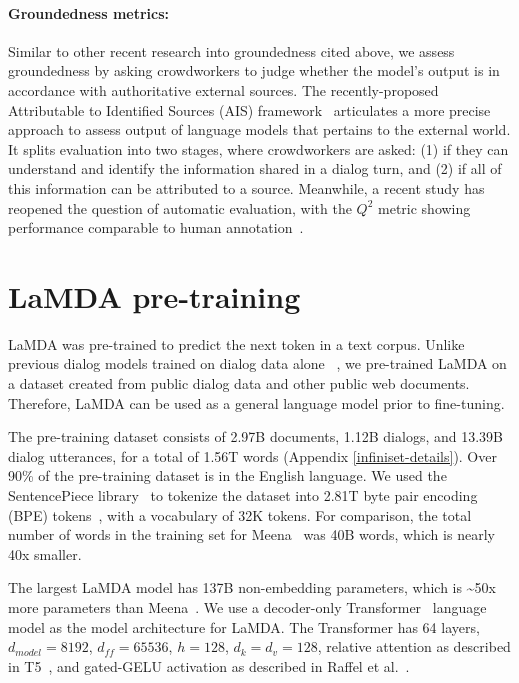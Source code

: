 \paragraph{Groundedness metrics:} Similar to other recent research into groundedness cited above, we assess groundedness by asking crowdworkers to judge whether the model’s output is in accordance with authoritative external sources. The recently-proposed Attributable to Identified Sources (AIS) framework~\cite{rashkin2021measuring} articulates a more precise approach to assess output of language models that pertains to the external world. It splits evaluation into two stages, where crowdworkers are asked: (1) if they can understand and identify the information shared in a dialog turn, and (2) if all of this information can be attributed to a source. Meanwhile, a recent study has reopened the question of automatic evaluation, with the $Q^2$ metric showing performance comparable to human annotation~\cite{honovich2021q2}.

\section{LaMDA pre-training}
\label{sec:pretraining}

LaMDA was pre-trained to predict the next token in a text corpus. Unlike previous dialog models trained on dialog data alone ~\cite{adiwardana2020humanlike,blenderbot}, we pre-trained LaMDA on a dataset created from public dialog data and other public web documents. Therefore, LaMDA can be used as a general language model prior to fine-tuning.

The pre-training dataset consists of 2.97B documents, 1.12B dialogs, and 13.39B dialog utterances, for a total of 1.56T words (Appendix \ref{infiniset-details}). Over 90\% of the pre-training dataset is in the English language. We used the SentencePiece library~\cite{sentencepiece} to tokenize the dataset into 2.81T byte pair encoding (BPE) tokens~\cite{sennrich2015neural}, with a vocabulary of 32K tokens. For comparison, the total number of words in the training set for Meena~\cite{adiwardana2020humanlike} was 40B words, which is nearly 40x smaller. 

The largest LaMDA model has 137B non-embedding parameters, which is {\textasciitilde}50x more parameters than Meena~\cite{adiwardana2020humanlike}. We use a decoder-only Transformer~\cite{Vaswani2017AttentionIA} language model as the model architecture for LaMDA. The Transformer has 64 layers, $d_{model}=8192$, $d_{ff}=65536$, $h=128$, $d_k=d_v=128$, relative attention as described in T5~\cite{t5}, and gated-GELU activation as described in Raffel et al.~\cite{shazeer2020glu}.

